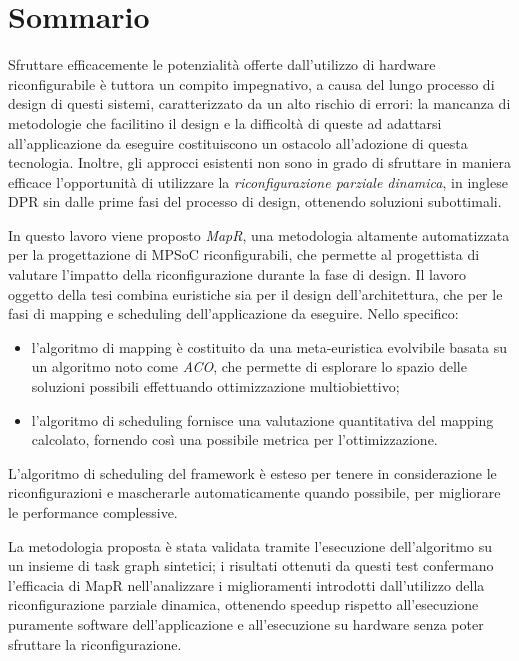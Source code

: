 \chapter*{Sommario}
\vspace{0.5cm}
Sfruttare efficacemente le potenzialit\`a offerte dall'utilizzo di hardware riconfigurabile
\`e tuttora un compito impegnativo, a causa del lungo processo di design di questi sistemi,
caratterizzato da un alto rischio di errori: la mancanza di metodologie che facilitino il design e
la difficolt\`a di queste ad adattarsi all'applicazione da eseguire costituiscono
un ostacolo all'adozione di questa tecnologia.
Inoltre, gli approcci esistenti non sono in grado di sfruttare in maniera efficace
l'opportunit\`a di utilizzare la \emph{riconfigurazione parziale dinamica}, in inglese
\ac{DPR} sin dalle prime fasi del processo di design, ottenendo soluzioni subottimali.

In questo lavoro viene proposto \emph{MapR}, una metodologia
altamente automatizzata per la progettazione di \acs{MPSoC} riconfigurabili, che permette
al progettista di valutare l'impatto della riconfigurazione durante la fase di design.
Il lavoro oggetto della tesi combina euristiche sia per il design dell'architettura, che per
le fasi di mapping e scheduling dell'applicazione da eseguire.
Nello specifico:
\begin{itemize}
  \item l'algoritmo di mapping \`e costituito da una meta-euristica evolvibile basata su un
    algoritmo noto come \emph{\ac{ACO}}, che permette di esplorare lo spazio delle
    soluzioni possibili effettuando ottimizzazione multiobiettivo;
  \item l'algoritmo di scheduling fornisce una valutazione quantitativa del mapping calcolato,
    fornendo cos\`i una possibile metrica per l'ottimizzazione.
\end{itemize}
L'algoritmo di scheduling del framework \`e esteso per tenere in considerazione
le riconfigurazioni e mascherarle automaticamente quando possibile, per migliorare le
performance complessive.

La metodologia proposta \`e stata validata tramite l'esecuzione dell'algoritmo
su un insieme di task graph sintetici; i risultati ottenuti da questi test confermano
l'efficacia di MapR nell'analizzare i miglioramenti introdotti dall'utilizzo della riconfigurazione
parziale dinamica, ottenendo speedup rispetto all'esecuzione puramente software dell'applicazione
e all'esecuzione su hardware senza poter sfruttare la riconfigurazione.
